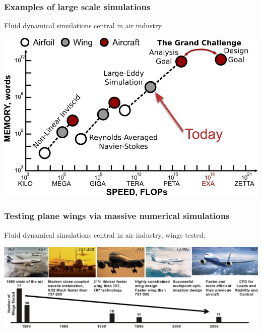 \documentclass{beamer}
\begin{document}
\begin{frame}
\frametitle{Examples of large scale simulations}

\begin{block}{Fluid dynamical simulations central in air industry. }


\centerline{\includegraphics[width=0.6\linewidth]{fig-future/fig10.jpg}}


\end{block}
\end{frame}

\begin{frame}
\frametitle{Testing plane wings via massive numerical simulations}

\begin{block}{}
Fluid dynamical simulations central in air industry, wings tested.


\centerline{\includegraphics[width=1.0\linewidth]{fig-future/fig8.jpg}}


\end{block}
\end{frame}
\end{document}
